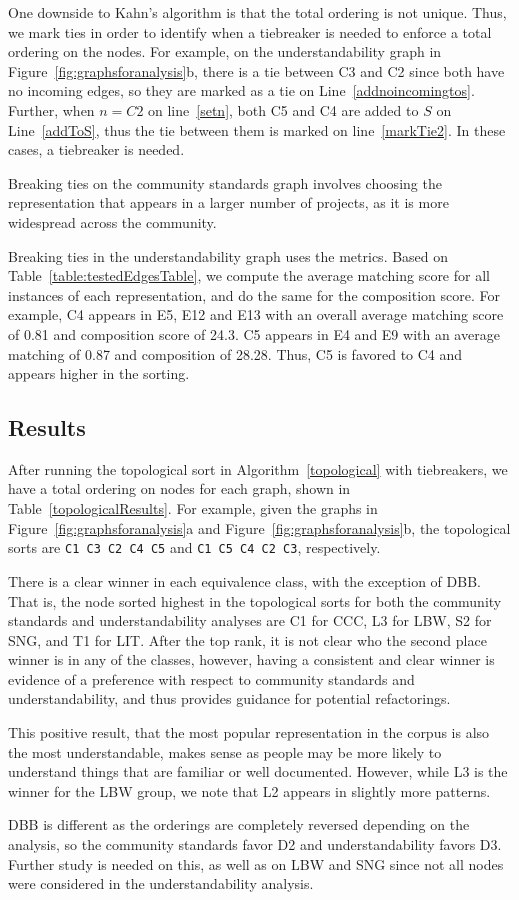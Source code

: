 One downside to Kahn's algorithm is that the total ordering is not unique. Thus, we mark ties in order to identify when a tiebreaker is needed to enforce a total ordering on the nodes. For example, on the understandability graph in Figure~\ref{fig:graphsforanalysis}b, there is a tie between C3 and C2 since both have no incoming edges, so they are marked as a tie on Line~\ref{addnoincomingtos}. Further, when $n=C2$ on line~\ref{setn}, both C5 and C4 are added to $S$ on Line~\ref{addToS}, thus the tie between them is marked on line~\ref{markTie2}. In these cases, a tiebreaker is needed.

Breaking ties on the community standards graph involves choosing the representation that appears in a larger number of projects, as it is more widespread across the community.

Breaking ties in the understandability graph uses the metrics. Based on Table~\ref{table:testedEdgesTable}, we compute the average matching score for all instances of each representation, and do the same for the composition score. For example, C4 appears in E5, E12 and E13 with an overall average matching score of 0.81 and composition score of 24.3. C5 appears in E4 and E9 with an average matching of 0.87 and composition of 28.28. Thus, C5 is favored to C4 and appears higher in the sorting.

\subsection{Results}
After running the topological sort in Algorithm~\ref{topological} with tiebreakers, we have a total ordering on nodes for each graph, shown in Table~\ref{topologicalResults}.  For example, given the graphs in Figure~\ref{fig:graphsforanalysis}a and Figure~\ref{fig:graphsforanalysis}b, the topological sorts are {\tt C1 C3 C2 C4 C5} and {\tt C1 C5 C4 C2 C3}, respectively.



There is a clear winner in each equivalence class, with the exception of DBB.
That is, the node sorted highest in the topological sorts for both the community standards and understandability analyses are C1 for CCC, L3 for LBW, S2 for SNG, and T1 for LIT.
After the top rank, it is not clear who the second place winner is in any of the classes, however, having a consistent and clear winner is evidence of a preference with respect to community standards and understandability, and thus provides guidance for potential refactorings.

This positive result, that the most popular representation in the corpus is also the most understandable, makes sense as people may be more likely to understand things that are familiar or well documented. However, while L3 is the winner for the LBW group, we note that L2 appears in slightly more patterns.

DBB is different  as the orderings are completely reversed depending on the analysis, so the community standards favor D2 and understandability favors D3. Further study is needed on this, as well as on LBW and SNG since not all nodes were considered in the understandability analysis.

